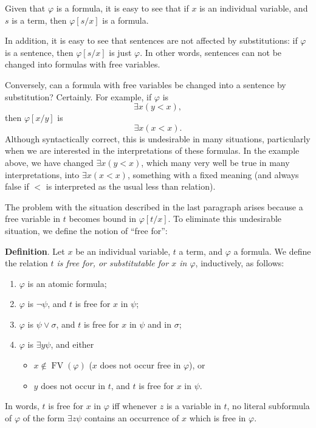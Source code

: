 \documentclass[12pt]{article}
\begin{document}
Given that $\varphi$ is a formula, it is easy to see that if $x$ is an individual variable, and $s$ is a term, then $\varphi[s/x]$ is a formula.  

In addition, it is easy to see that sentences are not affected by substitutions: if $\varphi$ is a sentence, then $\varphi[s/x]$ is just $\varphi$.  In other words, sentences can not be changed into formulas with free variables.  

Conversely, can a formula with free variables be changed into a sentence by substitution?  Certainly.  For example, if $\varphi$ is $$\exists x (y < x),$$ then $\varphi[x/y]$ is $$\exists x (x < x).$$  Although syntactically correct, this is undesirable in many situations, particularly when we are interested in the interpretations of these formulas.  In the example above, we have changed $\exists x (y < x)$, which many very well be true in many interpretations, into $\exists x (x < x)$, something with a fixed meaning (and always false if $<$ is interpreted as the usual less than relation).

The problem with the situation described in the last paragraph arises because a free variable in $t$ becomes bound in $\varphi[t/x]$.  To eliminate this undesirable situation, we define the notion of ``free for'':

\textbf{Definition}.  Let $x$ be an individual variable, $t$ a term, and $\varphi$ a formula.  We define the relation 
\emph{$t$ is free for, or substitutable for $x$ in $\varphi$}, inductively, as follows:
\begin{enumerate}
\item $\varphi$ is an atomic formula;
\item $\varphi$ is $\neg \psi$, and $t$ is free for $x$ in $\psi$;
\item $\varphi$ is $\psi \vee \sigma$, and $t$ is free for $x$ in $\psi$ and in $\sigma$;
\item $\varphi$ is $\exists y \psi$, and either
\begin{itemize}
\item $x\notin \operatorname{FV}(\varphi)$ ($x$ does not occur free in $\varphi$), or 
\item $y$ does not occur in $t$, and $t$ is free for $x$ in $\psi$.
\end{itemize}
\end{enumerate}
In words, $t$ is free for $x$ in $\varphi$ iff whenever $z$ is a variable in $t$, no literal subformula of $\varphi$ of the form $\exists z \psi$ contains an occurrence of $x$ which is free in $\varphi$.
\end{document}
